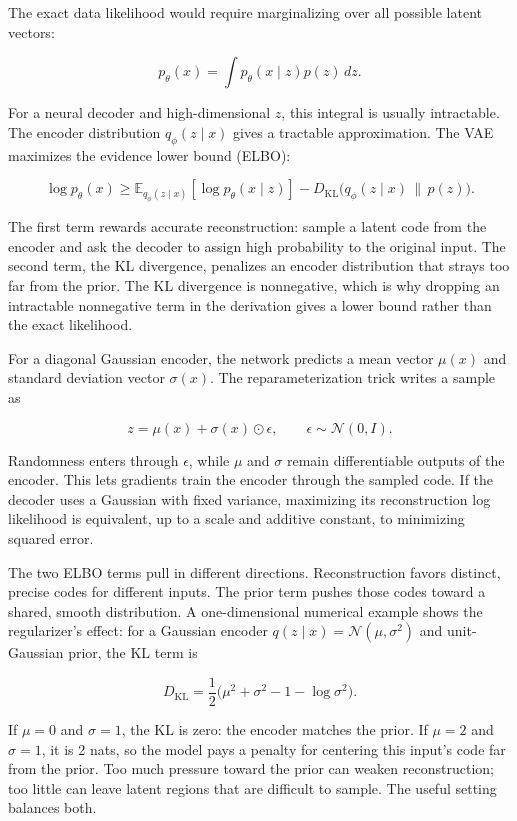 The exact data likelihood would require marginalizing over all possible latent vectors:

\[
p_\theta(x)=\int p_\theta(x\mid z)p(z)\,dz.
\]

For a neural decoder and high-dimensional \(z\), this integral is usually intractable. The encoder distribution \(q_\phi(z\mid x)\) gives a tractable approximation. The VAE maximizes the evidence lower bound (ELBO):

\[
\log p_\theta(x)\geq
\mathbb{E}_{q_\phi(z\mid x)}[\log p_\theta(x\mid z)]
- D_{\mathrm{KL}}\big(q_\phi(z\mid x)\,\|\,p(z)\big).
\]

The first term rewards accurate reconstruction: sample a latent code from the encoder and ask the decoder to assign high probability to the original input. The second term, the KL divergence, penalizes an encoder distribution that strays too far from the prior. The KL divergence is nonnegative, which is why dropping an intractable nonnegative term in the derivation gives a lower bound rather than the exact likelihood.

For a diagonal Gaussian encoder, the network predicts a mean vector \(\mu(x)\) and standard deviation vector \(\sigma(x)\). The reparameterization trick writes a sample as

\[
z=\mu(x)+\sigma(x)\odot\epsilon,\qquad \epsilon\sim\mathcal{N}(0,I).
\]

Randomness enters through \(\epsilon\), while \(\mu\) and \(\sigma\) remain differentiable outputs of the encoder. This lets gradients train the encoder through the sampled code. If the decoder uses a Gaussian with fixed variance, maximizing its reconstruction log likelihood is equivalent, up to a scale and additive constant, to minimizing squared error.

The two ELBO terms pull in different directions. Reconstruction favors distinct, precise codes for different inputs. The prior term pushes those codes toward a shared, smooth distribution. A one-dimensional numerical example shows the regularizer's effect: for a Gaussian encoder \(q(z\mid x)=\mathcal{N}(\mu,\sigma^2)\) and unit-Gaussian prior, the KL term is

\[
D_{\mathrm{KL}}=\frac12\big(\mu^2+\sigma^2-1-\log\sigma^2\big).
\]

If \(\mu=0\) and \(\sigma=1\), the KL is zero: the encoder matches the prior. If \(\mu=2\) and \(\sigma=1\), it is 2 nats, so the model pays a penalty for centering this input's code far from the prior. Too much pressure toward the prior can weaken reconstruction; too little can leave latent regions that are difficult to sample. The useful setting balances both.

